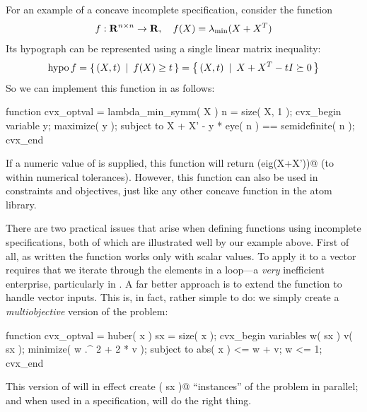 \documentclass[12pt]{article}
\begin{document}
For an example of a concave incomplete specification, consider the function
\begin{equation}
	f:\R^{n\times n}\rightarrow\R, \quad f(X) = \lambda_{\min}(X+X^T)
\end{equation}
Its hypograph can be represented using a single linear matrix inequality:
\begin{equation}
	\operatorname{hypo} f = \left\{\, (X,t) \,~|~\, f(X) \geq t \,\right\} = \left\{\, (X,t) \,~|~\, X + X^T - t I \succeq 0 \,\right\}
\end{equation}
So we can implement this function in \cvx as follows:
\begin{code}
	function cvx_optval = lambda_min_symm( X )
	n = size( X, 1 );
	cvx_begin
	    variable y;
	    maximize( y );
	    subject to
	        X + X' - y * eye( n ) == semidefinite( n );
	cvx_end
\end{code}
If a numeric value of \verb@X@ is supplied, this function will return
\verb@min(eig(X+X'))@ (to within numerical tolerances). However, this function
can also be used in \cvx constraints and objectives, just like any other concave
function in the atom library.

There are two practical issues that arise when defining functions
using incomplete specifications, both of which are illustrated well by
our \verb@huber@ example above. First of all, as written the function works
only with scalar values. To apply it to a vector requires that we iterate
through the elements in a \verb@for@ loop---a \emph{very} inefficient enterprise,
particularly in \cvx. A far better 
approach is to extend the \verb@huber@ function to handle vector inputs. This
is, in fact, rather simple to do: we simply create a \emph{multiobjective}
version of the problem:
\begin{code}
	function cvx_optval = huber( x )
	sx = size( x );
	cvx_begin
	    variables w( sx ) v( sx );
	    minimize( w .^ 2 + 2 * v );
	    subject to
	        abs( x ) <= w + v;
	        w <= 1;
	cvx_end
\end{code}
This version of \verb@huber@ will in effect create \verb@prod( sx )@ ``instances''
of the problem in parallel; and when used in a \cvx specification,
\cvx will do the right thing.
\end{document}
